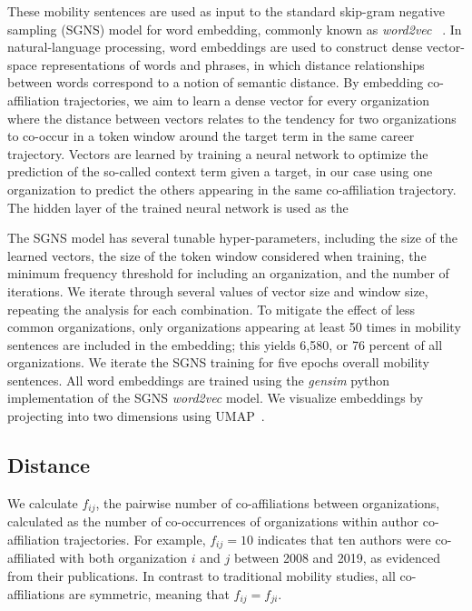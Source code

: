 \documentclass[12pt]{article} %
\begin{document}
These mobility sentences are used as input to the standard skip-gram negative sampling (SGNS) model for word embedding, commonly known as \textit{word2vec}~\autocite{mikolov2013word2vec} .
In natural-language processing, word embeddings are used to construct dense vector-space representations of words and phrases, in which distance relationships between words correspond to a notion of semantic distance.
By embedding co-affiliation trajectories, we aim to learn a dense vector for every organization where the distance between vectors relates to the tendency for two organizations to co-occur in a token window around the target term in the same career trajectory.
Vectors are learned by training a neural network to optimize the prediction of the so-called context term given a target, in our case using one organization to predict the others appearing in the same co-affiliation trajectory.
The hidden layer of the trained neural network is used as the

The SGNS model has several tunable hyper-parameters, including the size of the learned vectors, the size of the token window considered when training, the minimum frequency threshold for including an organization, and the number of iterations.
We iterate through several values of vector size and window size, repeating the analysis for each combination.
To mitigate the effect of less common organizations, only organizations appearing at least 50 times in mobility sentences are included in the embedding;
this yields 6,580, or 76 percent of all organizations.
We iterate the SGNS training for five epochs overall mobility sentences.
All word embeddings are trained using the \textit{gensim} python implementation of the SGNS \textit{word2vec} model.
We visualize embeddings by projecting into two dimensions using UMAP~\autocite{mcinnes2018umap}.

%
%
\subsection{Distance}
We calculate $f_{ij}$, the pairwise number of co-affiliations between organizations, calculated as the number of co-occurrences of organizations within author co-affiliation trajectories.
For example, $f_{ij} = 10$ indicates that ten authors were co-affiliated with both organization $i$ and $j$ between 2008 and 2019, as evidenced from their publications.
In contrast to traditional mobility studies, all co-affiliations are symmetric, meaning that $f_{ij} = f_{ji}$.
\end{document}
